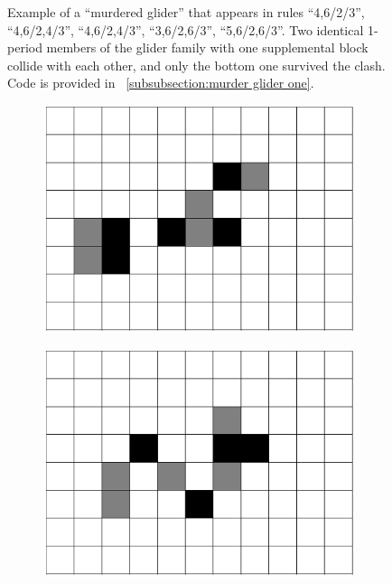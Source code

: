 \documentclass[12pt]{article}
\numberwithin{figure}{section} %
\begin{document}
\begin{figure}[H]
\begin{subfigure}{0.23\textwidth}
     	\subcaption{}
   	\end{subfigure}
   \caption[Example of a "murdered glider"]{Example of a “murdered glider” that appears in rules “4,6/2/3”, “4,6/2,4/3”, “4,6/2,4/3”, “3,6/2,6/3”, “5,6/2,6/3”. Two identical 1-period members of the glider family with one supplemental block collide with each other, and only the bottom one survived the clash. Code is provided in ~\ref{subsubsection:murder glider one}. }
   \label{fig:murder glider one}
\end{figure}

\begin{figure}[htbp]
	\begin{subfigure}{0.23\textwidth}
     		\centering
     		\includegraphics[width=\linewidth]{Section4/33.0}
     		\subcaption{}
   	\end{subfigure}
    	\begin{subfigure}{0.23\textwidth}
     		\centering
     		\includegraphics[width=\linewidth]{Section4/33.1}

\end{subfigure}
\end{figure}
\end{document}
